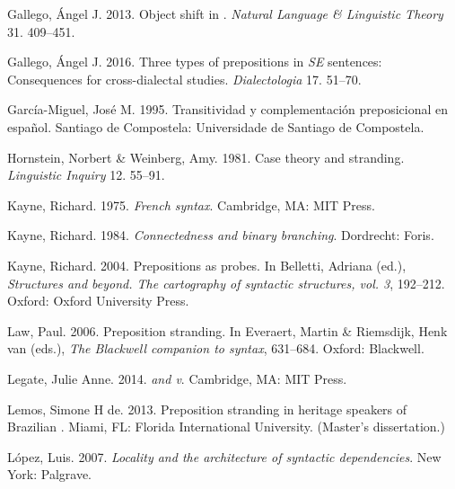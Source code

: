 \documentclass[output=paper]{langsci/langscibook}
\begin{document}
Gallego, Ángel J. 2013. Object shift in . \textit{Natural Language \& Linguistic Theory} 31. 409–451.

\begin{styleBodyTextIn}
Gallego, Ángel J. 2016. Three types of prepositions in  \textit{SE} sentences: Consequences for cross-dialectal studies. \textit{Dialectologia} 17. 51–70.
\end{styleBodyTextIn}

\begin{styleBodyTextIn}
García-Miguel, José M. 1995. Transitividad y complementación preposicional en español. Santiago de Compostela: Universidade de Santiago de Compostela.
\end{styleBodyTextIn}

\begin{styleBodyTextIn}
Hornstein, Norbert \& Weinberg, Amy. 1981. Case theory and  stranding. \textit{Linguistic Inquiry} 12. 55–91.
\end{styleBodyTextIn}

Kayne, Richard. 1975. \textit{French syntax}. Cambridge, MA: MIT Press.

Kayne, Richard. 1984. \textit{Connectedness and binary branching}. Dordrecht: Foris.

Kayne, Richard. 2004. Prepositions as probes. In Belletti, Adriana (ed.), \textit{Structures and beyond. The cartography of syntactic structures, vol. 3}, 192–212. Oxford: Oxford University Press.

\begin{styleTextbodyindent}
Law, Paul. 2006. Preposition stranding. In Everaert, Martin \& Riemsdijk, Henk van (eds.), \textit{The Blackwell companion to syntax}, 631–684. Oxford: Blackwell.
\end{styleTextbodyindent}

\begin{styleTextbodyindent}
Legate, Julie Anne. 2014. \textit{ and v}. Cambridge, MA: MIT Press.
\end{styleTextbodyindent}

Lemos, Simone H de. 2013. Preposition stranding in heritage speakers of Brazilian . Miami, FL: Florida International University. (Master’s dissertation.)

\begin{styleTextbodyindent}
López, Luis. 2007. \textit{Locality and the architecture of syntactic dependencies}. New York: Palgrave.
\end{styleTextbodyindent}
\end{document}
